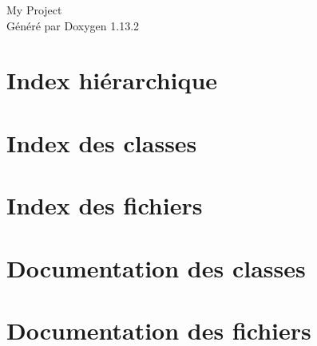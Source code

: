 \documentclass[twoside]{book}
\newcommand{\+}{\discretionary{\mbox{\scriptsize$\hookleftarrow$}}{}{}}
\newcommand{\clearemptydoublepage}{%
    \newpage{\pagestyle{empty}\cleardoublepage}%
  }
\begin{document}
  \raggedbottom
    \hypersetup{pageanchor=false,
                bookmarksnumbered=true,
                pdfencoding=unicode
               }
  \begin{titlepage}
  \vspace*{7cm}
  \begin{center}%
  {\Large My Project}\\
  \vspace*{1cm}
  {\large Généré par Doxygen 1.13.2}\\
  \end{center}
  \end{titlepage}
  \clearemptydoublepage
  \tableofcontents
  \clearemptydoublepage
  \hypersetup{pageanchor=true}

\chapter{Index hiérarchique}

\chapter{Index des classes}

\chapter{Index des fichiers}

\chapter{Documentation des classes}











\chapter{Documentation des fichiers}














  \backmatter
  \newpage
  \clearemptydoublepage
  \printindex
\end{document}
